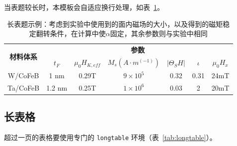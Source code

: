 当表题较长时，本模板会自适应换行处理，如表~\ref{tab:example_long_table}。

\begin{table}[!h]
  \centering
  \caption{长表题示例：考虑到实验中使用到的面内磁场的大小，以及得到的磁矩稳定翻转条件，在计算中使$\alpha$固定，其余参数则与实验中相同}
  \label{tab:example_long_table}
  \begin{tabular}{c c c c c c c}
    \toprule
    \multirow{2}{*}{\textbf{材料体系}} & \multicolumn{6}{c}{\textbf{参数}} \\
    & $t_F$ & $\mu_0H_{K,eff}$ & $M_s(A\cdot m^(-1))$ & $|\Theta_SH|$ & $\iota$ & $\mu_0H_x$ \\ \midrule
   W/CoFeB & 1 nm & 0.29T & $9\times 10^5$ & 0.32 & 0.31 & 24mT \\
   Ta/CoFeB & 1.2 nm & 0.25T & $1\times 10^6$ & 0.03 & 2 & 20mT \\ \bottomrule
  \end{tabular}
\end{table}

\vspace{-1pt}
\subsection{长表格}

超过一页的表格要使用专门的 \texttt{longtable} 环境（表~\ref{tab:longtable}）。\\

